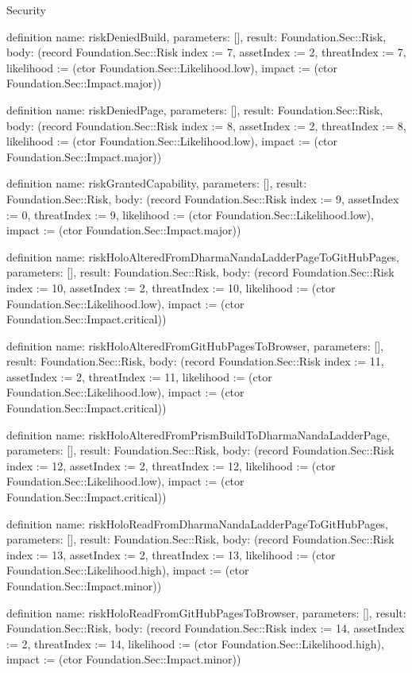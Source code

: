 \begin{lexlean}{Security}
\begin{semanticmodule}
definition{
  name: riskDeniedBuild,
  parameters: [],
  result: Foundation.Sec::Risk,
  body: (record Foundation.Sec::Risk {index := 7, assetIndex := 2, threatIndex := 7, likelihood := (ctor Foundation.Sec::Likelihood.low), impact := (ctor Foundation.Sec::Impact.major)})
}

definition{
  name: riskDeniedPage,
  parameters: [],
  result: Foundation.Sec::Risk,
  body: (record Foundation.Sec::Risk {index := 8, assetIndex := 2, threatIndex := 8, likelihood := (ctor Foundation.Sec::Likelihood.low), impact := (ctor Foundation.Sec::Impact.major)})
}

definition{
  name: riskGrantedCapability,
  parameters: [],
  result: Foundation.Sec::Risk,
  body: (record Foundation.Sec::Risk {index := 9, assetIndex := 0, threatIndex := 9, likelihood := (ctor Foundation.Sec::Likelihood.low), impact := (ctor Foundation.Sec::Impact.major)})
}

definition{
  name: riskHoloAlteredFromDharmaNandaLadderPageToGitHubPages,
  parameters: [],
  result: Foundation.Sec::Risk,
  body: (record Foundation.Sec::Risk {index := 10, assetIndex := 2, threatIndex := 10, likelihood := (ctor Foundation.Sec::Likelihood.low), impact := (ctor Foundation.Sec::Impact.critical)})
}

definition{
  name: riskHoloAlteredFromGitHubPagesToBrowser,
  parameters: [],
  result: Foundation.Sec::Risk,
  body: (record Foundation.Sec::Risk {index := 11, assetIndex := 2, threatIndex := 11, likelihood := (ctor Foundation.Sec::Likelihood.low), impact := (ctor Foundation.Sec::Impact.critical)})
}

definition{
  name: riskHoloAlteredFromPrismBuildToDharmaNandaLadderPage,
  parameters: [],
  result: Foundation.Sec::Risk,
  body: (record Foundation.Sec::Risk {index := 12, assetIndex := 2, threatIndex := 12, likelihood := (ctor Foundation.Sec::Likelihood.low), impact := (ctor Foundation.Sec::Impact.critical)})
}

definition{
  name: riskHoloReadFromDharmaNandaLadderPageToGitHubPages,
  parameters: [],
  result: Foundation.Sec::Risk,
  body: (record Foundation.Sec::Risk {index := 13, assetIndex := 2, threatIndex := 13, likelihood := (ctor Foundation.Sec::Likelihood.high), impact := (ctor Foundation.Sec::Impact.minor)})
}

definition{
  name: riskHoloReadFromGitHubPagesToBrowser,
  parameters: [],
  result: Foundation.Sec::Risk,
  body: (record Foundation.Sec::Risk {index := 14, assetIndex := 2, threatIndex := 14, likelihood := (ctor Foundation.Sec::Likelihood.high), impact := (ctor Foundation.Sec::Impact.minor)})
}


\end{semanticmodule}
\end{lexlean}
